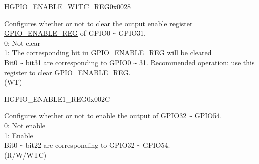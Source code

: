 \begin{register}{H}{GPIO\_ENABLE\_W1TC\_REG}{0x0028}\label{regdesc:GPIOENABLEW1TCREG}
%
\regnewline%
\begin{regdesc}\begin{reglist}
\label{fielddesc:GPIOENABLEW1TC}\item [GPIO\_ENABLE\_W1TC] Configures whether or not to clear the output enable register \hyperref[regdesc:GPIOENABLEREG]{GPIO\_ENABLE\_REG} of GPIO0 \verb+~+ GPIO31. \\
0: Not clear\\
1: The corresponding bit in \hyperref[regdesc:GPIOENABLEREG]{GPIO\_ENABLE\_REG} will be cleared\\
Bit0 \verb+~+ bit31 are corresponding to GPIO0 \verb+~+ 31. Recommended operation: use this register to clear \hyperref[regdesc:GPIOENABLEREG]{GPIO\_ENABLE\_REG}.\\
(WT)
\end{reglist}\end{regdesc}
\end{register}


\begin{register}{H}{GPIO\_ENABLE1\_REG}{0x002C}\label{regdesc:GPIOENABLE1REG}
%
%
\regnewline%
\begin{regdesc}\begin{reglist}
\label{fielddesc:GPIOENABLE1DATA}\item [GPIO\_ENABLE1\_DATA] Configures whether or not to enable the output of GPIO32 \verb+~+ GPIO54.\\
0: Not enable\\
1: Enable\\
Bit0 \verb+~+ bit22 are corresponding to GPIO32 \verb+~+ GPIO54. \\
(R/W/WTC)
\end{reglist}\end{regdesc}
\end{register}


